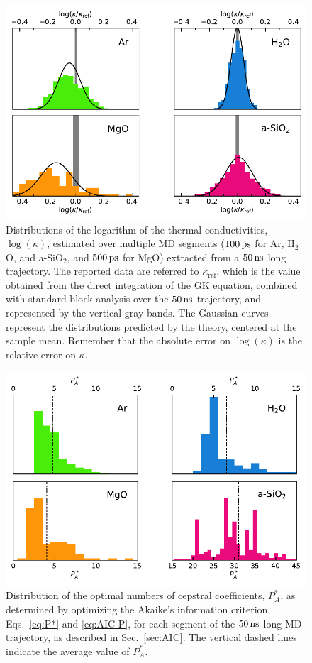 \begin{figure}[!tb]
    \centering
    \includegraphics[width=\textwidth]{chapters/chapter5/figures/histograms.pdf}
    \caption{Distributions of the logarithm of the thermal conductivities, $\log(\kappa)$, estimated over multiple MD segments ($100\,\mathrm{ps}$ for Ar, H$_2$O, and a-SiO$_2$, and $500\,\mathrm{ps}$ for MgO) extracted from a $50\,\mathrm{ns}$ long trajectory. The reported data are referred to $\kappa_\mathrm{ref}$, which is the value obtained from the direct integration of the GK equation, combined with standard block analysis over the $50\,\mathrm{ns}$ trajectory, and represented by the vertical gray bands. The Gaussian curves represent the distributions predicted by the theory, centered at the sample mean. Remember that the absolute error on $\log(\kappa)$ is the relative error on $\kappa$.}
    \label{fig:histograms}
\end{figure}
\begin{figure}[!tb]
    \centering
    \includegraphics[width=\textwidth]{chapters/chapter5/figures/Pstar_distribution.pdf}
    \caption{Distribution of the optimal numbers of cepstral coefficients, $P_A^*$, as determined by optimizing the Akaike's information criterion, Eqs.~\eqref{eq:P*} and \eqref{eq:AIC-P}, for each segment of the $50\,\mathrm{ns}$ long MD trajectory, as described in Sec.~\ref{sec:AIC}. The vertical dashed lines indicate the average value of $P_A^*$.}
    \label{fig:Pstar_distribution}
\end{figure}
